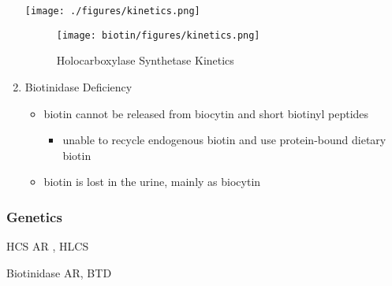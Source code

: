 \documentclass{scrartcl}
\begin{document}
\begin{enumerate}
\begin{center}
\texttt{[image: ./figures/kinetics.png]}
\end{center}

\begin{figure}[htbp]
\centering
\texttt{[image: biotin/figures/kinetics.png]}
\caption[Kinetics]{\label{fig:orga507a37}Holocarboxylase Synthetase Kinetics}
\end{figure}

\item Biotinidase Deficiency
\label{sec:org476ff23}
\begin{itemize}
\item biotin cannot be released from biocytin and short biotinyl
peptides
\begin{itemize}
\item unable to recycle endogenous biotin and use protein-bound dietary biotin
\end{itemize}
\item biotin is lost in the urine, mainly as biocytin
\end{itemize}
\end{enumerate}

\subsubsection{Genetics}
\label{sec:orgbea3613}
\begin{description}
\item{HCS} AR , HLCS
\item{Biotinidase} AR, BTD
\end{description}
\end{document}
